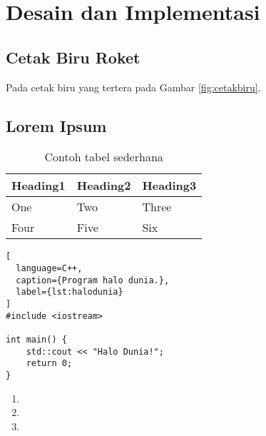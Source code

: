 \section{Desain dan Implementasi}
\label{sec:desaindanimplementasi}

\subsection{Cetak Biru Roket}
\label{subsec:cetakbiruroket}

Pada cetak biru yang tertera pada Gambar \ref{fig:cetakbiru}. \lipsum[8]

\lipsum[9-10]

\subsection{Lorem Ipsum}
\label{subsec:loremipsum}

\lipsum[11]

\begin{table}
  \caption{Contoh tabel sederhana}
  \label{tab:tabelsederhana}
  \centering
  \begin{tabular}{lll}
    \toprule
    Heading1 & Heading2 & Heading3 \\
    \midrule
    One      & Two      & Three    \\
    Four     & Five     & Six      \\
    \bottomrule
  \end{tabular}
\end{table}

\begin{lstlisting}[
  language=C++,
  caption={Program halo dunia.},
  label={lst:halodunia}
]
#include <iostream>

int main() {
    std::cout << "Halo Dunia!";
    return 0;
}
\end{lstlisting}

\lipsum[12]

\begin{enumerate}
  \item \lipsum[13][1-4]
  \item \lipsum[13][5-8]
  \item \lipsum[13][9-12]
\end{enumerate}

\lipsum[14-15]